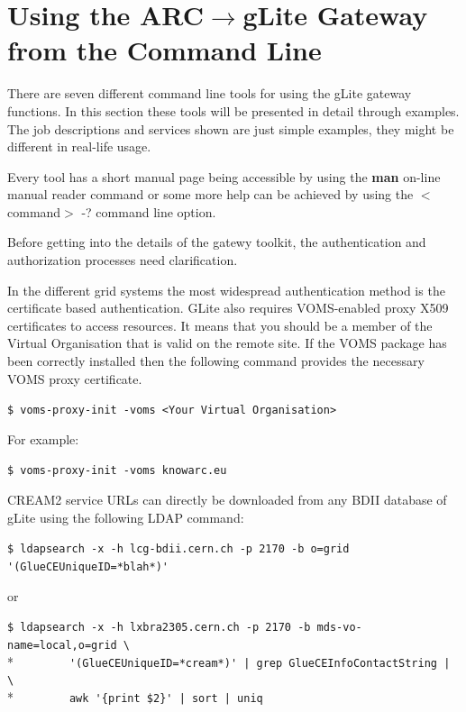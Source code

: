\documentclass{article}
\begin{document}
\section{Using the ARC${\rightarrow}$gLite Gateway from the Command Line}
\label{Users guide}
There are seven different command line tools for using the gLite gateway functions. In this section these tools will be presented in detail through examples. The job descriptions and services shown are just simple examples, they might be different in real-life usage.\par
Every tool has a short manual page being accessible by using the \textbf{man} on-line manual reader command or some more help can be achieved by using the $<$command$>$ -? command line option.\par
Before getting into the details of the gatewy toolkit, the authentication and authorization processes need clarification.\par
In the different grid systems the most widespread authentication method is the certificate based authentication. GLite also requires VOMS-enabled proxy X509 certificates to access resources. It means that you should be a member of the Virtual Organisation that is valid on the remote site. If the VOMS package has been correctly installed then the following command provides the necessary VOMS proxy certificate.\par
\begin{shaded}\verb#$ voms-proxy-init -voms <Your Virtual Organisation>#\end{shaded}
For example:
\begin{shaded}\verb#$ voms-proxy-init -voms knowarc.eu#\end{shaded}
CREAM2 service URLs can directly be downloaded from any BDII database of gLite using the following LDAP command:
\begin{shaded}
\verb#$ ldapsearch -x -h lcg-bdii.cern.ch -p 2170 -b o=grid '(GlueCEUniqueID=*blah*)'#
\end{shaded}
or
\begin{shaded}
\verb#$ ldapsearch -x -h lxbra2305.cern.ch -p 2170 -b mds-vo-name=local,o=grid \#\\*
\verb#        '(GlueCEUniqueID=*cream*)' | grep GlueCEInfoContactString | \#\\*
\verb#        awk '{print $2}' | sort | uniq#
\end{shaded}
\end{document}
